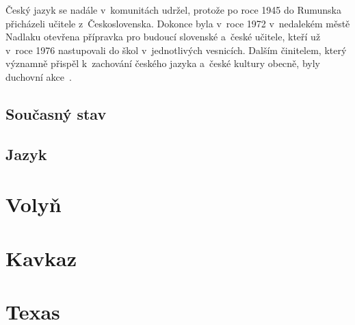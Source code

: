 Český jazyk se nadále v~komunitách udržel, protože po roce 1945 do Rumunska přicházeli učitele z~Československa. Dokonce byla v~roce 1972 v~nedalekém městě Nadlaku otevřena přípravka pro budoucí slovenské a~české učitele, kteří už v~roce 1976 nastupovali do škol v~jednotlivých vesnicích. Dalším činitelem, který významně přispěl k~zachování českého jazyka a~české kultury obecně, byly duchovní akce~\parencite{Vaculik2009b}.

\hypertarget{souux10dasnuxfd-stav}{%
\subsection*{Současný stav}\label{souux10dasnuxfd-stav}}

\hypertarget{jazyk}{%
\subsection*{Jazyk}\label{jazyk}}

\hypertarget{volyux148}{%
\section{Volyň}\label{volyux148}}

\hypertarget{kavkaz}{%
\section{Kavkaz}\label{kavkaz}}

\hypertarget{texas}{%
\section{Texas}\label{texas}}
